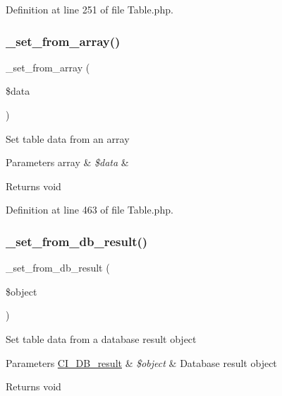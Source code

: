 Definition at line 251 of file Table.\+php.

\mbox{\label{class_c_i___table_a79c6ca8fd1f4e5b4bee157209e866a02}} 
\subsubsection{\texorpdfstring{\_set\_from\_array()}{\_set\_from\_array()}}
{\footnotesize\ttfamily \+\_\+set\+\_\+from\+\_\+array (\begin{DoxyParamCaption}\item[{}]{\$data }\end{DoxyParamCaption})\hspace{0.3cm}{\ttfamily [protected]}}

Set table data from an array


\begin{DoxyParams}[1]{Parameters}
array & {\em \$data} & \\
\hline
\end{DoxyParams}
\begin{DoxyReturn}{Returns}
void 
\end{DoxyReturn}


Definition at line 463 of file Table.\+php.

\mbox{\label{class_c_i___table_a76d76f4f5ffe03c119b95164dcebf9ed}} 
\subsubsection{\texorpdfstring{\_set\_from\_db\_result()}{\_set\_from\_db\_result()}}
{\footnotesize\ttfamily \+\_\+set\+\_\+from\+\_\+db\+\_\+result (\begin{DoxyParamCaption}\item[{}]{\$object }\end{DoxyParamCaption})\hspace{0.3cm}{\ttfamily [protected]}}

Set table data from a database result object


\begin{DoxyParams}[1]{Parameters}
\mbox{\hyperlink{class_c_i___d_b__result}{C\+I\+\_\+\+D\+B\+\_\+result}} & {\em \$object} & Database result object \\
\hline
\end{DoxyParams}
\begin{DoxyReturn}{Returns}
void 
\end{DoxyReturn}


